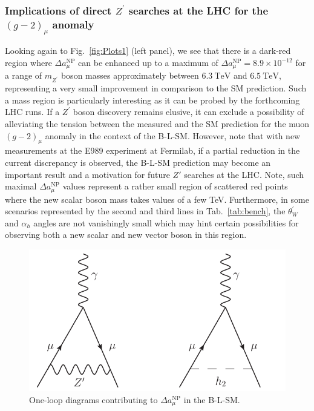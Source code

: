 \documentclass[10pt]{report}
\newcommand{\ro}[1]{\textrm{#1}}
\begin{document}
\subsubsection{Implications of direct $Z^\prime$ searches at the LHC for the $\left(g-2\right)_\mu$ anomaly}

Looking again to Fig.~\ref{fig:Plots1} (left panel), we see that there is a dark-red region where $\Delta a_\mu^{\ro{NP}}$ can be enhanced up to a maximum of $\Delta a_\mu^{\mathrm{NP}} = 8.9 \times 10^{-12}$ for a range of $m_{Z^\prime}$ boson masses approximately between $6.3~\ro{TeV}$ and $6.5~\ro{TeV}$, representing a very small improvement in comparison to the SM prediction. Such a mass region is particularly interesting as it can be probed by the forthcoming LHC runs. If a $Z^\prime$ boson discovery remains elusive, it can exclude a possibility of alleviating the tension between the measured and the SM prediction for the muon $\left(g-2\right)_\mu$ anomaly in the context of the B-L-SM. However, note that with new measurements at the E989 experiment at Fermilab, if a partial reduction in the current discrepancy is observed, the B-L-SM prediction may become an important result and a motivation for future $Z'$ searches at the LHC. Note, such maximal $\Delta a^{\ro{NP}}_\mu$ values represent a rather small region of scattered red points where the new scalar boson mass takes values of a few TeV. Furthermore, in some scenarios represented by the second and third lines in Tab.~\ref{tab:bench}, the $\theta_W^\prime$ and $\alpha_h$ angles are not vanishingly small which may hint certain possibilities for observing both a new scalar and new vector boson in this region.
\begin{figure}[!htb]
	\centering
	\includegraphics[scale=0.75]{Images/BLSM_2/g-2.pdf}
	\caption{One-loop diagrams contributing to $\Delta a_\mu^{\ro{NP}}$ in the B-L-SM.}
	\label{fig:g-2}
\end{figure}	
\end{document}
